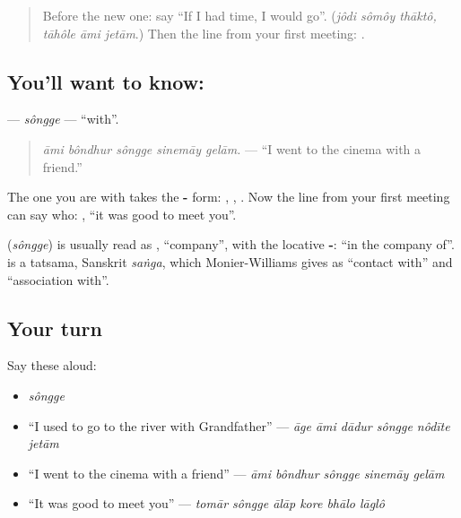 \label{lesson:BN-C275-songge}



\begin{quote}
Before the new one: say \textquotedblleft{}If I had time, I would go\textquotedblright{}. (\emph{jôdi sômôy thāktô, tāhôle āmi jetām}.) Then the line from your first meeting: \textbf{   }.
\end{quote}

\subsection*{You'll want to know: }
\textbf{} — \emph{sôngge} — \textquotedblleft{}with\textquotedblright{}.

\begin{quote}
\textbf{    }
\end{quote}

\begin{quote}
\emph{āmi bôndhur sôngge sinemāy gelām.} — \textquotedblleft{}I went to the cinema with a friend.\textquotedblright{}
\end{quote}

The one you are with takes the \textbf{-} form: \textbf{ }, \textbf{ }, \textbf{ }. Now the line from your first meeting can say who: \textbf{     }, \textquotedblleft{}it was good to meet you\textquotedblright{}.

\begin{cousinweb}
\textbf{} (\emph{sôngge}) is usually read as \textbf{}, \textquotedblleft{}company\textquotedblright{}, with the locative \textbf{-}: \textquotedblleft{}in the company of\textquotedblright{}. \textbf{} is a tatsama, Sanskrit \emph{saṅga}, which Monier-Williams gives as \textquotedblleft{}contact with\textquotedblright{} and \textquotedblleft{}association with\textquotedblright{}.
\end{cousinweb}

\subsection*{Your turn}
Say these aloud:

\begin{itemize}
\raggedright
  \item \emph{sôngge}
  \item \textquotedblleft{}I used to go to the river with Grandfather\textquotedblright{} — \emph{āge āmi dādur sôngge nôdīte jetām}
  \item \textquotedblleft{}I went to the cinema with a friend\textquotedblright{} — \emph{āmi bôndhur sôngge sinemāy gelām}
  \item \textquotedblleft{}It was good to meet you\textquotedblright{} — \emph{tomār sôngge ālāp kore bhālo lāglô}
\end{itemize}

